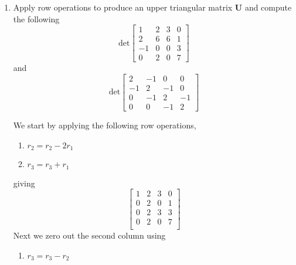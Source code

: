 \begin{enumerate}[label=\arabic*.]
    \item Apply row operations to produce an upper triangular matrix
        $\mathbf{U}$ and compute the following
        \begin{equation}
            \text{det}
            \begin{bmatrix}
                1   &   2   &   3   &   0   \\
                2   &   6   &   6   &   1   \\
                -1  &   0   &   0   &   3   \\
                0   &   2   &   0   &   7
            \end{bmatrix}
        \end{equation}
        and
        \begin{equation}
            \text{det}
            \begin{bmatrix}
                2   &   -1  &   0   &   0   \\
                -1  &   2   &   -1  &   0   \\
                0   &   -1  &   2   &   -1  \\
                0   &   0   &   -1  &   2
            \end{bmatrix}
        \end{equation}
        \begin{mdframed}[style=MyFrame]
            We start by applying the following row operations,
            \begin{enumerate}
                \item $r_{2} = r_{2} - 2r_{1}$
                \item $r_{3} = r_{3} + r_{1}$
            \end{enumerate}
            giving
            \begin{equation}
                \begin{bmatrix}
                    1   &   2   &   3   &   0   \\
                    0   &   2   &   0   &   1   \\
                    0   &   2   &   3   &   3   \\
                    0   &   2   &   0   &   7   \\
                \end{bmatrix}
            \end{equation}
            Next we zero out the second column using
            \begin{enumerate}
                \item $r_{3} = r_{3} - r_{2}$

\end{enumerate}
\end{mdframed}
\end{enumerate}
